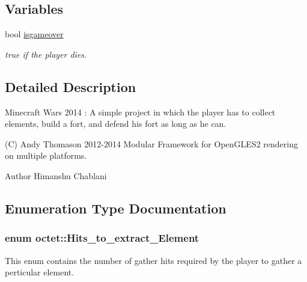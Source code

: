 \subsection*{Variables}
\begin{DoxyCompactItemize}
\item 
bool \hyperlink{namespaceoctet_a5a22a4300513019999dad2034dbd719b}{isgameover}
\begin{DoxyCompactList}\small\item\em true if the player dies. \end{DoxyCompactList}\end{DoxyCompactItemize}


\subsection{Detailed Description}
Minecraft Wars 2014 \+: A simple project in which the player has to collect elements, build a fort, and defend his fort as long as he can. 

(C) Andy Thomason 2012-\/2014 Modular Framework for Open\+G\+L\+E\+S2 rendering on multiple platforms. \begin{DoxyAuthor}{Author}
Himanshu Chablani 
\end{DoxyAuthor}


\subsection{Enumeration Type Documentation}
\hypertarget{namespaceoctet_ae8a703c3351a9f48aa7ad96fc57c55b4}{
\subsubsection[{Hits\+\_\+to\+\_\+extract\+\_\+\+Element}]{\setlength{\rightskip}{0pt plus 5cm}enum {\bf octet\+::\+Hits\+\_\+to\+\_\+extract\+\_\+\+Element}}}\label{namespaceoctet_ae8a703c3351a9f48aa7ad96fc57c55b4}


This enum contains the number of gather hits required by the player to gather a perticular element. 

